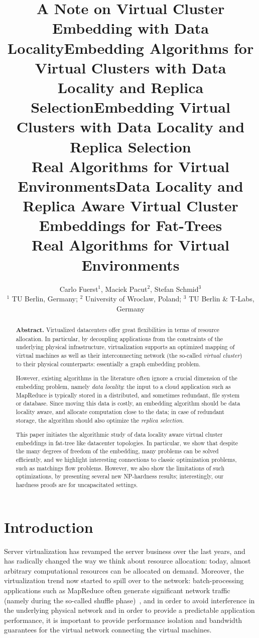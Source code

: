 \documentclass[9pt,twocolumn]{scrartcl}
\title{A Note on Virtual Cluster Embedding with Data Locality}
\title{Embedding Algorithms for Virtual Clusters with Data Locality and Replica Selection}
\title{Embedding Virtual Clusters with Data Locality and Replica Selection\\{\Large Real Algorithms for Virtual Environments}}
\title{Data Locality and Replica Aware Virtual Cluster Embeddings for Fat-Trees\\{\Large Real Algorithms for Virtual Environments}}
\author{Carlo Fuerst$^1$, Maciek Pacut$^2$, Stefan Schmid$^3$\\
$^1$ TU Berlin, Germany; $^2$ University of Wroclaw, Poland; $^3$ TU Berlin \& T-Labs, Germany}
\begin{document}
\maketitle


\begin{abstract}
\textbf{Abstract.} Virtualized datacenters offer great flexibilities in terms of resource allocation. In particular, by
decoupling applications from the constraints of the underlying physical infrastructure, virtualization
supports an optimized mapping of virtual machines as well as their interconnecting network (the so-called \emph{virtual cluster}) to their
physical counterparts: essentially a graph embedding problem.

However, existing algorithms
in the literature often ignore a crucial dimension of the embedding problem, namely \emph{data locality}:
the input to a cloud application such as MapReduce is typically stored in a distributed,
and sometimes redundant, file system or database. Since moving this data is costly, an embedding algorithm should be data locality aware,
and allocate computation close to the data; in case of redundant storage, the algorithm should also optimize the \emph{replica selection}.

This paper initiates the algorithmic study of data locality aware virtual cluster embeddings in fat-tree like datacenter topologies.
In particular, we
show that
despite the many degrees of freedom of the embedding, many problems can be
solved efficiently, and we highlight interesting connections
to classic optimization problems, such as matchings
flow problems. However, we also show the limitations of such optimizations,
by presenting several new NP-hardness results; interestingly,
our hardness proofs are for uncapacitated settings.
\end{abstract}

\section{Introduction}

Server virtualization has revamped the server business over the last years,
and has radically changed the way we think about resource allocation:
today, almost arbitrary computational resources can be allocated on demand.
Moreover, the virtualization trend now started to spill over to the network:
batch-processing applications such as MapReduce often generate significant
network traffic (namely during the so-called shuffle phase)~\cite{amazonbw},
and in order to avoid interference in the underlying physical network and in order to provide a predictable
application performance, it is important to provide performance isolation and bandwidth guarantees
for the virtual network connecting the virtual machines.~\cite{talk-about}
\end{document}
